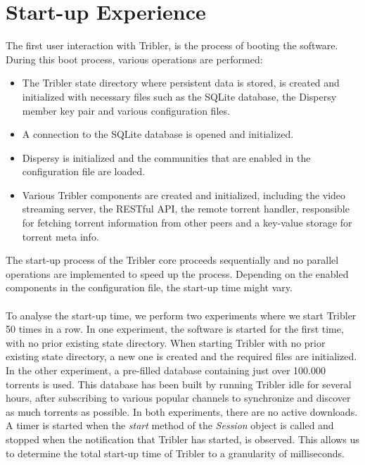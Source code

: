 \section{Start-up Experience}
\label{sec:startup-experience}
The first user interaction with Tribler, is the process of booting the software. During this boot process, various operations are performed:
\begin{itemize}
	\item The Tribler state directory where persistent data is stored, is created and initialized with necessary files such as the SQLite database, the Dispersy member key pair and various configuration files.
	\item A connection to the SQLite database is opened and initialized.
	\item Dispersy is initialized and the communities that are enabled in the configuration file are loaded.
	\item Various Tribler components are created and initialized, including the video streaming server, the RESTful API, the remote torrent handler, responsible for fetching torrent information from other peers and a key-value storage for torrent meta info.
\end{itemize}
The start-up process of the Tribler core proceeds sequentially and no parallel operations are implemented to speed up the process. Depending on the enabled components in the configuration file, the start-up time might vary.\\\\
To analyse the start-up time, we perform two experiments where we start Tribler 50 times in a row. In one experiment, the software is started for the first time, with no prior existing state directory. When starting Tribler with no prior existing state directory, a new one is created and the required files are initialized. In the other experiment, a pre-filled database containing just over 100.000 torrents is used. This database has been built by running Tribler idle for several hours, after subscribing to various popular channels to synchronize and discover as much torrents as possible. In both experiments, there are no active downloads. A timer is started when the \emph{start} method of the \emph{Session} object is called and stopped when the notification that Tribler has started, is observed. This allows us to determine the total start-up time of Tribler to a granularity of milliseconds.\\\\
